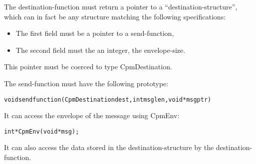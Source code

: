 The destination-function must return a pointer to a
``destination-structure'', which can in fact be any structure matching
the following specifications:

\begin{itemize}
\item{The first field must be a pointer to a send-function,}
\item{The second field must the an integer, the envelope-size.}
\end{itemize}

This pointer must be coerced to type CpmDestination.

The send-function must have the following prototype:

\begin{alltt}
    void sendfunction(CpmDestination dest, int msglen, void *msgptr)
\end{alltt}

It can access the envelope of the message using CpmEnv:

\begin{alltt}
    int *CpmEnv(void *msg);
\end{alltt}

It can also access the data stored in the destination-structure
by the destination-function.

